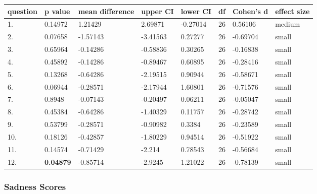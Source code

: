 \documentclass[11pt, twoside, reqno]{book}
\begin{document}
\begin{table}[h!]
    \raggedright
    \begin{tabular}{|l|l|l|l|l|l|l|l|}
    \hline
        question & p value & mean difference & upper CI & lower CI & df & Cohen's d & effect size  \\ \hline
        1. & 0.14972 & 1.21429 & 2.69871 & -0.27014 & 26 & 0.56106 & medium \\ \hline
        2. & 0.07658 & -1.57143 & -3.41563 & 0.27277 & 26 & -0.69704 & small \\ \hline
        3. & 0.65964 & -0.14286 & -0.58836 & 0.30265 & 26 & -0.16838 & small \\ \hline
        4. & 0.45892 & -0.14286 & -0.89467 & 0.60895 & 26 & -0.28416 & small \\ \hline
        5. & 0.13268 & -0.64286 & -2.19515 & 0.90944 & 26 & -0.58671 & small \\ \hline
        6. & 0.06944 & -0.28571 & -2.17944 & 1.60801 & 26 & -0.71576 & small \\ \hline
        7. & 0.8948 & -0.07143 & -0.20497 & 0.06211 & 26 & -0.05047 & small \\ \hline
        8. & 0.45384 & -0.64286 & -1.40329 & 0.11757 & 26 & -0.28742 & small \\ \hline
        9. & 0.53799 & -0.28571 & -0.90982 & 0.3384 & 26 & -0.23589 & small \\ \hline
        10. & 0.18126 & -0.42857 & -1.80229 & 0.94514 & 26 & -0.51922 & small \\ \hline
        11. & 0.14574 & -0.71429 & -2.214 & 0.78543 & 26 & -0.56684 & small \\ \hline
        12. & \textbf{0.04879} & -0.85714 & -2.9245 & 1.21022 & 26 & -0.78139 & small \\ \hline
    \end{tabular}
\end{table}

\subsubsection{\textbf{Sadness Scores}}
\end{document}
